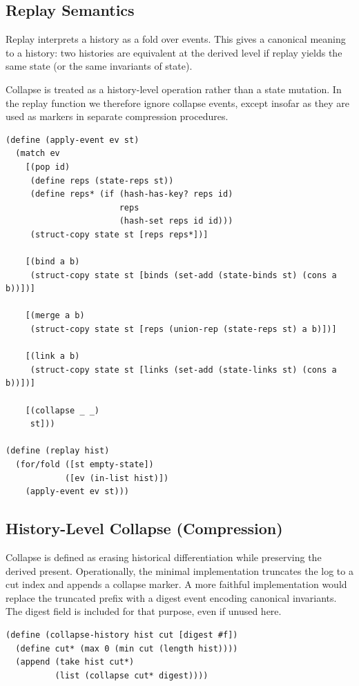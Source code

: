 \documentclass[11pt]{article}
\begin{document}
\subsection{Replay Semantics}

Replay interprets a history as a fold over events. This gives a canonical meaning
to a history: two histories are equivalent at the derived level if replay yields
the same state (or the same invariants of state).

Collapse is treated as a history-level operation rather than a state mutation.
In the replay function we therefore ignore collapse events, except insofar as
they are used as markers in separate compression procedures.

\begin{verbatim}
(define (apply-event ev st)
  (match ev
    [(pop id)
     (define reps (state-reps st))
     (define reps* (if (hash-has-key? reps id)
                       reps
                       (hash-set reps id id)))
     (struct-copy state st [reps reps*])]

    [(bind a b)
     (struct-copy state st [binds (set-add (state-binds st) (cons a b))])]

    [(merge a b)
     (struct-copy state st [reps (union-rep (state-reps st) a b)])]

    [(link a b)
     (struct-copy state st [links (set-add (state-links st) (cons a b))])]

    [(collapse _ _)
     st]))

(define (replay hist)
  (for/fold ([st empty-state])
            ([ev (in-list hist)])
    (apply-event ev st)))
\end{verbatim}

\subsection{History-Level Collapse (Compression)}

Collapse is defined as erasing historical differentiation while preserving the
derived present. Operationally, the minimal implementation truncates the log to a
cut index and appends a collapse marker. A more faithful implementation would
replace the truncated prefix with a digest event encoding canonical invariants.
The digest field is included for that purpose, even if unused here.

\begin{verbatim}
(define (collapse-history hist cut [digest #f])
  (define cut* (max 0 (min cut (length hist))))
  (append (take hist cut*)
          (list (collapse cut* digest))))
\end{verbatim}
\end{document}
